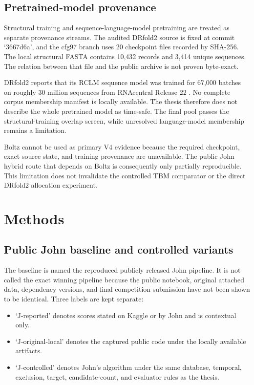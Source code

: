 \documentclass[12pt,a4paper,oneside]{report}
\begin{document}
\section{Pretrained-model provenance}

Structural training and sequence-language-model pretraining are treated as separate
provenance streams. The audited DRfold2 source is fixed at commit `3667d6a', and the
cfg97 branch uses 20 checkpoint files recorded by SHA-256. The local structural FASTA
contains 10,432 records and 3,414 unique sequences. The relation between that file and
the public archive is not proven byte-exact.

DRfold2 reports that its RCLM sequence model was trained for 67,000 batches on roughly
30 million sequences from RNAcentral Release 22 \cite{drfold2}. No complete corpus
membership manifest is locally available. The thesis therefore does not describe the
whole pretrained model as time-safe. The final pool passes the structural-training
overlap screen, while unresolved language-model membership remains a limitation.

Boltz cannot be used as primary V4 evidence because the required checkpoint, exact
source state, and training provenance are unavailable. The public John hybrid route
that depends on Boltz is consequently only partially reproducible. This limitation
does not invalidate the controlled TBM comparator or the direct DRfold2 allocation
experiment.

\chapter{Methods}

\section{Public John baseline and controlled variants}

The baseline is named the reproduced publicly released John pipeline. It is not called
the exact winning pipeline because the public notebook, original attached data,
dependency versions, and final competition submission have not been shown to be
identical. Three labels are kept separate:

\begin{itemize}
  \item `J-reported' denotes scores stated on Kaggle or by John and is contextual only.
  \item `J-original-local' denotes the captured public code under the locally
  available artifacts.
  \item `J-controlled' denotes John's algorithm under the same database, temporal,
  exclusion, target, candidate-count, and evaluator rules as the thesis.
\end{itemize}
\end{document}
